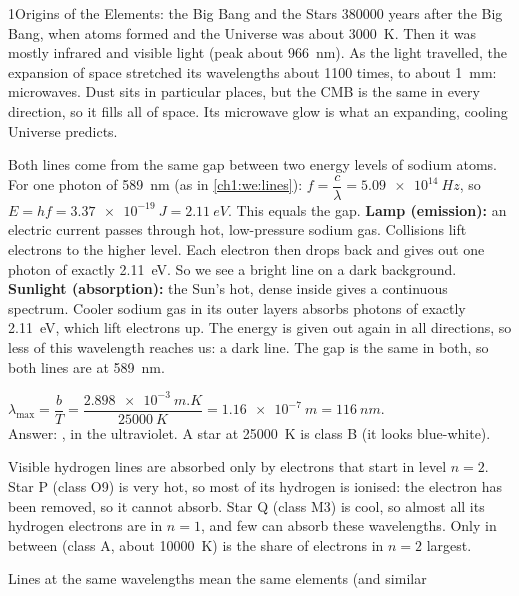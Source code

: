 \begin{chapteranswers}{1}{Origins of the Elements: the Big Bang and the Stars}
        \num{380000} years after the Big Bang, when atoms formed and the Universe was
        about \qty{3000}{K}. Then it was mostly infrared and visible light (peak about
        \qty{966}{nm}). As the light travelled, the expansion of space stretched its
        wavelengths about 1100 times, to about \qty{1}{mm}: microwaves. Dust sits in
        particular places, but the CMB is the same in every direction, so it fills all
        of space. Its microwave glow is what an expanding, cooling Universe predicts.
  \item Both lines come from the same gap between two energy levels of sodium atoms.
        For one photon of \qty{589}{nm} (as in \cref{ch1:we:lines}):
        $f = \dfrac{c}{\lambda} = \qty{5.09e14}{Hz}$, so
        $E = hf = \qty{3.37e-19}{J} = \qty{2.11}{eV}$. This equals the gap.\newline
        \textbf{Lamp (emission):} an electric current passes through hot, low-pressure
        sodium gas. Collisions lift electrons to the higher level. Each electron then
        drops back and gives out one photon of exactly \qty{2.11}{eV}. So we see a
        bright line on a dark background.\newline
        \textbf{Sunlight (absorption):} the Sun's hot, dense inside gives a continuous
        spectrum. Cooler sodium gas in its outer layers absorbs photons of exactly
        \qty{2.11}{eV}, which lift electrons up. The energy is given out again in all
        directions, so less of this wavelength reaches us: a dark line.\newline
        The gap is the same in both, so both lines are at \qty{589}{nm}.
  \item $\lambda_\mathrm{max} = \dfrac{b}{T} = \dfrac{\qty{2.898e-3}{m.K}}{\qty{25000}{K}}
        = \qty{1.16e-7}{m} = \qty{116}{nm}$.\\[3pt] Answer: , in the
        ultraviolet. A star at \qty{25000}{K} is class B (it looks blue-white).
  \item Visible hydrogen lines are absorbed only by electrons that start in level
        $n = 2$. Star P (class O9) is very hot, so most of its hydrogen is ionised: the
        electron has been removed, so it cannot absorb. Star Q (class M3) is cool, so
        almost all its hydrogen electrons are in $n = 1$, and few can absorb these
        wavelengths. Only in between (class A, about \qty{10000}{K}) is the share of
        electrons in $n = 2$ largest.
  \item Lines at the same wavelengths mean the same elements (and similar

\end{chapteranswers}
